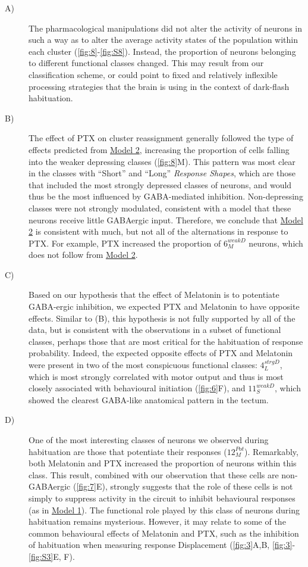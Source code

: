 \documentclass[9pt,lineno]{RandlettLab_elife}
\begin{document}
\begin{description}
\item[A)]
The pharmacological manipulations did not alter the activity of neurons in such a way as to alter the average activity states of the population within each cluster (\autoref{fig:8}-\autoref{fig:S8}). Instead, the proportion of neurons belonging to different functional classes changed. This may result from our classification scheme, or could point to fixed and relatively inflexible processing strategies that the brain is using in the context of dark-flash habituation.
\vspace{2mm}
\item[B)]
The effect of PTX on cluster reassignment generally followed the type of effects predicted from \underline{Model 2}, increasing the proportion of cells falling into the weaker depressing classes (\autoref{fig:8}M). This pattern was most clear in the classes with “Short” and “Long” \emph{Response Shapes}, which are those that included the most strongly depressed classes of neurons, and would thus be the most influenced by GABA-mediated inhibition. Non-depressing classes were not strongly modulated, consistent with a model that these neurons receive little GABAergic input. Therefore, we conclude that \underline{Model 2} is consistent with much, but not all of the alternations in response to PTX. For example, PTX increased the proportion of $6_{M}^{weakD}$ neurons, which does not follow from \underline{Model 2}.
\vspace{2mm}
\item[C)] 
Based on our hypothesis that the effect of Melatonin is to potentiate GABA-ergic inhibition, we expected PTX and Melatonin to have opposite effects. Similar to (B), this hypothesis is not fully supported by all of the data, but is consistent with the observations in a subset of functional classes, perhaps those that are most critical for the habituation of response probability. Indeed, the expected opposite effects of PTX and Melatonin were present in two of the most conspicuous functional classes: $4_{L}^{strgD}$, which is most strongly correlated with motor output and thus is most closely associated with behavioural initiation (\autoref{fig:6}F), and $11_{S}^{weakD}$, which showed the clearest GABA-like anatomical pattern in the tectum. 
\vspace{2mm}
\item[D)]
One of the most interesting classes of neurons we observed during habituation are those that potentiate their responses ($12_{M}^{Pot}$). Remarkably, both Melatonin and PTX increased the proportion of neurons within this class. This result, combined with our observation that these cells are non-GABAergic (\autoref{fig:7}E), strongly suggests that the role of these cells is not simply to suppress activity in the circuit to inhibit behavioural responses (as in \underline{Model 1}). The functional role played by this class of neurons during habituation remains mysterious. However, it may relate to some of the common behavioural effects of Melatonin and PTX, such as the inhibition of habituation when measuring response Displacement (\autoref{fig:3}A,B, \autoref{fig:3}-\autoref{fig:S3}E, F). 


\end{description}
\end{document}

